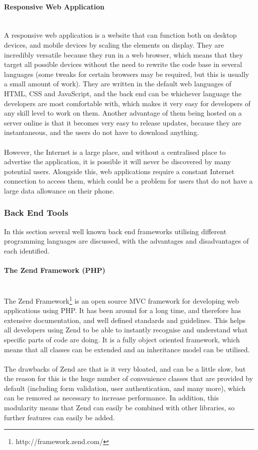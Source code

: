\paragraph{Responsive Web Application}\ \\
A responsive web application is a website that can function both on desktop devices, and mobile devices by scaling the elements on display. They are incredibly versatile because they run in a web browser, which means that they target all possible devices without the need to rewrite the code base in several languages (some tweaks for certain browsers may be required, but this is usually a small amount of work). They are written in the default web languages of HTML, CSS and JavaScript, and the back end can be whichever language the developers are most comfortable with, which makes it very easy for developers of any skill level to work on them. Another advantage of them being hosted on a server online is that it becomes very easy to release updates, because they are instantaneous, and the users do not have to download anything.\\
\ \\
However, the Internet is a large place, and without a centralised place to advertise the application, it is possible it will never be discovered by many potential users. Alongside this, web applications require a constant Internet connection to access them, which could be a problem for users that do not have a large data allowance on their phone.


\newpage 
\subsubsection{Back End Tools}
In this section several well known back end frameworks utilising different programming languages are discussed, with the advantages and disadvantages of each identified. 

\paragraph{The Zend Framework (PHP)}\ \\
The Zend Framework\footnote{http://framework.zend.com/} is an open source MVC framework for developing web applications using PHP. It has been around for a long time, and therefore has extensive documentation, and well defined standards and guidelines. This helps all developers using Zend to be able to instantly recognise and understand what specific parts of code are doing. It is a fully object oriented framework, which means that all classes can be extended and an inheritance model can be utilised.\ \\
\ \\
The drawbacks of Zend are that is it very bloated, and can be a little slow, but the reason for this is the huge number of convenience classes that are provided by default (including form validation, user authentication, and many more), which can be removed as necessary to increase performance. In addition, this modularity means that Zend can easily be combined with other libraries, so further features can easily be added.

